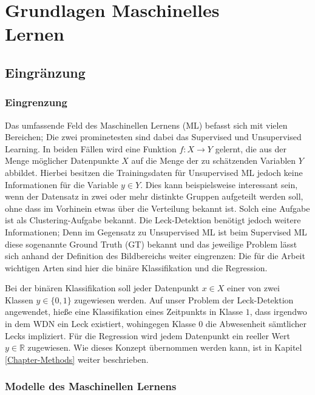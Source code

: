 \chapter{Grundlagen Maschinelles \\ Lernen \label{Chapter-ML}}

\section{Eingränzung}

\subsection*{Eingrenzung}

Das umfassende Feld des Maschinellen Lernens (ML) befasst sich mit vielen Bereichen;
 Die zwei prominetesten sind dabei das Supervised und Unsupervised Learning. In beiden Fällen wird eine Funktion
 $f: X \rightarrow Y$ gelernt, die aus der Menge möglicher Datenpunkte $X$ auf die Menge der zu schätzenden
 Variablen $Y$ abbildet. Hierbei besitzen die Trainingsdaten für Unsupervised ML jedoch keine Informationen für
 die Variable $y \in Y$. Dies kann beispielsweise interessant sein, wenn der Datensatz in zwei oder mehr distinkte
 Gruppen aufgeteilt werden soll, ohne dass im Vorhinein etwas über die Verteilung bekannt ist. Solch eine
 Aufgabe ist als Clustering-Aufgabe bekannt. Die Leck-Detektion benötigt jedoch weitere Informationen;
 Denn im Gegensatz zu Unsupervised ML ist beim Supervised ML diese sogenannte Ground Truth (GT) bekannt und
 das jeweilige Problem lässt sich anhand der Definition des Bildbereichs weiter eingrenzen: Die für die
 Arbeit wichtigen Arten sind hier die binäre Klassifikation und die Regression.

Bei der binären Klassifikation soll jeder Datenpunkt $x \in X$ einer von zwei Klassen $y \in \{0, 1\}$ zugewiesen
 werden. Auf unser Problem der Leck-Detektion angewendet, hieße eine Klassifikation eines Zeitpunkts in
 Klasse $1$, dass irgendwo in dem WDN ein Leck existiert, wohingegen Klasse $0$ die Abwesenheit sämtlicher
 Lecks impliziert. Für die Regression wird jedem Datenpunkt ein reeller Wert $y \in \mathbb{R}$ zugewiesen.
 Wie dieses Konzept übernommen werden kann, ist in Kapitel \ref{Chapter-Methods} weiter beschrieben. 


\subsection*{Modelle des Maschinellen Lernens}

